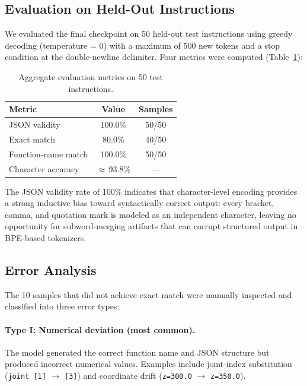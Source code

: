\documentclass[11pt,a4paper]{article}
\begin{document}
\subsection{Evaluation on Held-Out Instructions}

We evaluated the final checkpoint on 50 held-out test instructions using greedy decoding (temperature = 0)
with a maximum of 500 new tokens and a stop condition at the double-newline delimiter.
Four metrics were computed (Table~\ref{tab:metrics}):

\begin{table}[H]
    \centering
    \caption{Aggregate evaluation metrics on 50 test instructions.}
    \label{tab:metrics}
    \begin{tabular}{@{}lcc@{}}
        \toprule
        \textbf{Metric} & \textbf{Value} & \textbf{Samples} \\
        \midrule
        JSON validity        & 100.0\% & 50/50 \\
        Exact match          &  80.0\% & 40/50 \\
        Function-name match  & 100.0\% & 50/50 \\
        Character accuracy   & $\approx$\,93.8\% & --- \\
        \bottomrule
    \end{tabular}
\end{table}

The JSON validity rate of 100\% indicates that character-level encoding provides a strong inductive bias toward syntactically correct output:
every bracket, comma, and quotation mark is modeled as an independent character,
leaving no opportunity for subword-merging artifacts that can corrupt structured output in BPE-based tokenizers.

\subsection{Error Analysis}

The 10 samples that did not achieve exact match were manually inspected and classified into three error types:

\paragraph{Type I: Numerical deviation (most common).}
The model generated the correct function name and JSON structure but produced incorrect numerical values.
Examples include joint-index substitution (\texttt{joint [1]} $\to$ \texttt{[3]}) and coordinate drift (\texttt{z=300.0} $\to$ \texttt{z=350.0}).
\end{document}
